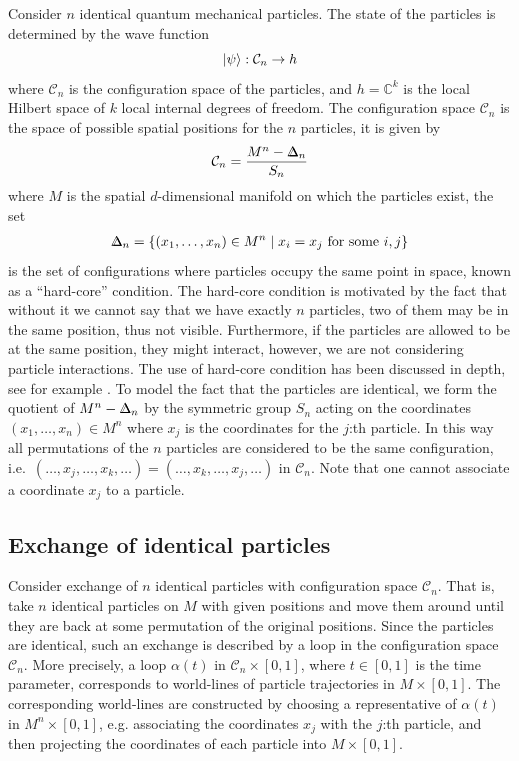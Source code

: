 \documentclass[a4paper,10pt,oneside]{book}
\theoremstyle{plain}
\theoremstyle{definition}
\theoremstyle{remark}
\def\bbDelta{{%
\setbox0\hbox{$\Delta$}%
\rlap{\hbox to \wd0{\hss\scalebox{0.82}{$\Delta$}}}\box0
}}
\DeclarePairedDelimiter\ket{\lvert}{\rangle}
\begin{document}
Consider $n$ identical quantum mechanical particles. The state of the particles is determined by the wave function
\begin{equation}
  \ket{\psi} : \mathcal{C}_n \to h
\end{equation}
where $\mathcal{C}_n$ is the configuration space of the particles, and $h = \mathbb{C}^k$ is the local Hilbert space of $k$ local internal degrees of freedom. The configuration space $\mathcal{C}_n$ is the space of possible spatial positions for the $n$ particles, it is given by
\begin{align}
  \mathcal{C}_n = \frac{M^n - \bbDelta_n}{S_n}
\end{align}
where $M$ is the spatial $d$-dimensional manifold on which the particles exist, the set
\begin{align}
  \bbDelta_n = \{(x_1,\ldots,x_n) \in M^n \mid x_i = x_j \text{ for some } i, j\}
\end{align}
is the set of configurations where particles occupy the same point in space, known as a ``hard-core'' condition. The hard-core condition is motivated by the fact that without it we cannot say that we have exactly $n$ particles, two of them may be in the same position, thus not visible. Furthermore, if the particles are allowed to be at the same position, they might interact, however, we are not considering particle interactions. The use of hard-core condition has been discussed in depth, see for example \cite{hard-core}. To model the fact that the particles are identical, we form the quotient of $M^n - \bbDelta_n$ by the symmetric group $S_n$ acting on the coordinates $(x_1,…,x_n) \in M^n$ where $x_j$ is the coordinates for the $j$:th particle. In this way all permutations of the $n$ particles are considered to be the same configuration, i.e.\ $(…,x_j,…,x_k,…) = (…,x_k,…,x_j,…)$ in $\mathcal{C}_n$. Note that one cannot associate a coordinate $x_j$ to a particle.


\subsection{Exchange of identical particles}

Consider exchange of $n$ identical particles with configuration space $\mathcal{C}_n$. That is, take $n$ identical particles on $M$ with given positions and move them around until they are back at some permutation of the original positions. Since the particles are identical, such an exchange is described by a loop in the configuration space $\mathcal{C}_n$. More precisely, a loop $\alpha(t)$ in $\mathcal{C}_n\times[0,1]$, where $t \in [0,1]$ is the time parameter, corresponds to world-lines of particle trajectories in $M\times[0,1]$. The corresponding world-lines are constructed by choosing a representative of $\alpha(t)$ in $M^n\times[0,1]$, e.g. associating the coordinates $x_j$ with the $j$:th particle, and then projecting the coordinates of each particle into $M\times[0,1]$.
\end{document}
